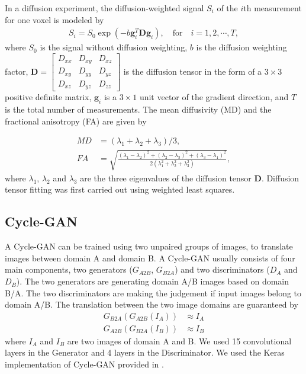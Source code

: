 \documentclass{article}
\begin{document}
In a diffusion experiment, the diffusion-weighted signal $S_i$ of the $i$th measurement for one voxel  is modeled by
\begin{align}
  S_i = S_0 \exp(-b \mathbf{g}_i^T \mathbf{Dg}_i), \quad \mathrm{for} \quad i = 1, 2, \cdots, T,
\end{align}
where $S_0$ is the signal without diffusion weighting, $b$ is the diffusion weighting factor, $\mathbf{D}=\begin{bmatrix}
  D_{xx} & D_{xy} & D_{xz} \\
  D_{xy} & D_{yy} & D_{yz} \\
  D_{xz} & D_{yz} & D_{zz}
\end{bmatrix}$ is the diffusion tensor in the form of a $3 \times 3$ positive definite matrix, $\mathbf{g}_i$ is a $3 \times 1$ unit vector of the gradient direction, and $T$ is the total number of measurements. The mean diffusivity (MD) and the fractional anisotropy (FA) are given by

\begin{align}
  MD&=(\lambda_1+\lambda_2+\lambda_3)/3, \\
  FA&=\sqrt{\frac{(\lambda_1-\lambda_2)^2+(\lambda_2-\lambda_3)^2+(\lambda_3-\lambda_1)^2}{2(\lambda_1^2+\lambda_2^2+\lambda_3^2)}},
\end{align}
where $\lambda_1$, $\lambda_2$ and $\lambda_3$ are the three eigenvalues of the diffusion tensor $\mathbf{D}$.
Diffusion tensor fitting was first carried out using weighted least squares.


\subsection{Cycle-GAN}
A Cycle-GAN \cite{zhu2017unpaired} can be trained using two unpaired groups of images, to translate images between domain A and domain B. A Cycle-GAN usually consists of four main components, two generators ($G_{A2B}$, $G_{B2A}$) and two discriminators ($D_A$ and $D_B$). The two generators are generating domain A/B images based on domain B/A. The two discriminators are making the judgement if input images belong to domain A/B. The translation between the two image domains are guaranteed by
\begin{align}
  G_{B2A}(G_{A2B}(I_A)) &\approx I_A \\
  G_{A2B}(G_{B2A}(I_B)) &\approx I_B
\end{align}
where $I_A$ and $I_B$ are two images of domain A and B. We used 15 convolutional layers in the Generator and 4 layers in the Discriminator. We used the Keras implementation of Cycle-GAN provided in \cite{welander2018generative}.
\end{document}
